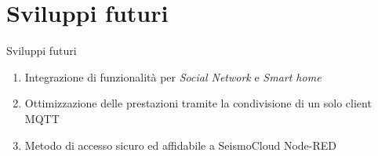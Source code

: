 \section{Sviluppi futuri}

\begin{frame}[c]{Sviluppi futuri}

\begin{enumerate}
  \item Integrazione di funzionalità per \textit{Social Network} e \textit{Smart home}
  \item Ottimizzazione delle prestazioni tramite la condivisione di un solo client MQTT
  \item Metodo di accesso sicuro ed affidabile a SeismoCloud Node-RED
\end{enumerate}

\end{frame}

